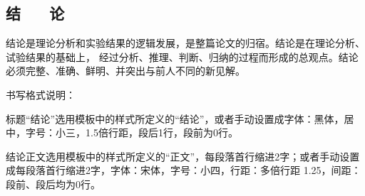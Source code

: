\begin{center}
    \section*{  \textbf{结 ~~ 论}}
    \end{center}

结论是理论分析和实验结果的逻辑发展，是整篇论文的归宿。结论是在理论分析、试验结果的基础上，
经过分析、推理、判断、归纳的过程而形成的总观点。结论必须完整、准确、鲜明、并突出与前人不同的新见解。

书写格式说明：

标题“结论”选用模板中的样式所定义的“结论”，或者手动设置成字体：黑体，居中，字号：小三，1.5倍行距，段后1行，段前为0行。

结论正文选用模板中的样式所定义的“正文”，每段落首行缩进2字；或者手动设置成每段落首行缩进2字，字体：宋体，字号：小四，行距：多倍行距 1.25，间距：段前、段后均为0行。
